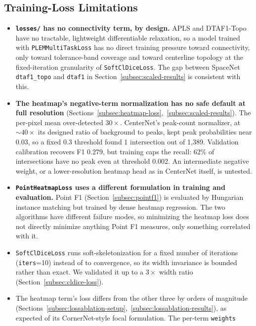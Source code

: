 \subsection{Training-Loss Limitations}

\begin{itemize}
  \item \textbf{\texttt{losses/} has no connectivity term, by design.} APLS and DTAF1-Topo have no
    tractable, lightweight differentiable relaxation, so a model trained with
    \texttt{PLEMMultiTaskLoss} has no direct training pressure toward connectivity, only toward
    tolerance-band coverage and toward centerline topology at the fixed-iteration granularity of
    \texttt{SoftClDiceLoss}. The gap between SpaceNet \texttt{dtaf1\_topo} and \texttt{dtaf1} in
    Section~\ref{subsec:scaled-results} is consistent with this.
  \item \textbf{The heatmap's negative-term normalization has no safe default at full resolution}
    (Sections~\ref{subsec:heatmap-loss},~\ref{subsec:scaled-results}). The per-pixel mean
    over-detected $30\times$. CenterNet's peak-count normalizer, at ${\sim}40\times$ its designed
    ratio of background to peaks, kept peak probabilities near 0.03, so a fixed 0.3 threshold found
    1 intersection out of 1,389. Validation calibration recovers F1 0.279, but training caps the
    recall: 62\% of intersections have no peak even at threshold 0.002. An intermediate negative
    weight, or a lower-resolution heatmap head as in CenterNet itself, is untested.
  \item \textbf{\texttt{PointHeatmapLoss} uses a different formulation in training and
    evaluation.} Point F1 (Section~\ref{subsec:pointf1}) is evaluated by Hungarian instance
    matching but trained by dense heatmap regression. The two algorithms have different failure
    modes, so minimizing the heatmap loss does not directly minimize anything Point F1 measures,
    only something correlated with it.
  \item \texttt{SoftClDiceLoss} runs soft-skeletonization for a fixed number of iterations
    (\texttt{iters}=10) instead of to convergence, so its width invariance is bounded rather than
    exact. We validated it up to a $3\times$ width ratio (Section~\ref{subsec:cldice-loss}).
  \item The heatmap term's loss differs from the other three by orders of magnitude
    (Sections~\ref{subsec:lossablation-setup},~\ref{subsec:lossablation-results}), as expected of
    its CornerNet-style focal formulation. The per-term \texttt{weights}

\end{itemize}
